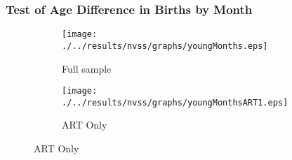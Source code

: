 \documentclass[10pt,letterpaper,subeqn]{beamer}
\begin{document}
\begin{frame}[label=Diff]
  \frametitle{Test of Age Difference in Births by Month}
\begin{figure}[htpb!]
\begin{center}
\caption{Birth Prevalence by Month, Age Group, and ART Usage}
\label{bqFig:concepMonth}
\begin{subfigure}{.5\textwidth}
  \centering
  \texttt{[image: ./../results/nvss/graphs/youngMonths.eps]}
  \caption{Full sample}
  \label{fig:concepAbs}
\end{subfigure}%
\begin{subfigure}{.5\textwidth}
  \centering
  \texttt{[image: ./../results/nvss/graphs/youngMonthsART1.eps]}
  \caption{ART Only}
  \label{fig:concepAbsART}
\end{subfigure}
\end{center}
\end{figure}
\vspace{6mm}
\hyperlink{MainDiff}{}
\end{frame}


%
\end{document}

